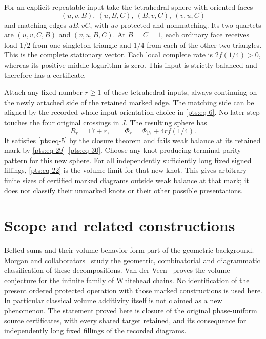 For an explicit repeatable input take the tetrahedral sphere with
oriented faces \begin{equation}\label{pts:eq-31}
(u,v,B),\ (u,B,C),\ (B,v,C),\ (v,u,C)
\end{equation} and matching edges \(uB,vC\), with \(uv\) protected and nonmatching.
Its two quartets are \((u,v,C,B)\) and \((v,u,B,C)\). At \(B=C=1\), each
ordinary face receives load \(1/2\) from one singleton triangle and
\(1/4\) from each of the other two triangles. This is the complete
stationary vector. Each local complete rate is \(2f(1/4)>0\), whereas
its positive middle logarithm is zero. This input is strictly balanced
and therefore has a certificate.

Attach any fixed number \(r\ge1\) of these tetrahedral inputs, always
continuing on the newly attached side of the retained marked edge. The
matching side can be aligned by the recorded whole-input orientation
choice in \eqref{pts:eq-6}. No later step touches the four original crossings in
\(J\). The resulting sphere has \begin{equation}\label{pts:eq-32}
R_r=17+r,\qquad
              \Phi_r=\Phi_{17}+4r f(1/4).
\end{equation} It satisfies \eqref{pts:eq-5} by the closure theorem and fails weak balance at its
retained mark by \eqref{pts:eq-29}--\eqref{pts:eq-30}. Choose any knot-producing terminal parity
pattern for this new sphere. For all independently sufficiently long
fixed signed fillings, \eqref{pts:eq-22} is the volume limit for that new knot. This
gives arbitrary finite sizes of certified marked diagrams outside weak
balance at that mark; it does not classify their unmarked knots or their
other possible presentations.

\section{Scope and related
constructions}\label{pts:sec-8}

Belted sums and their volume behavior form part of the geometric
background. Morgan and collaborators~\cite{MorganEtAlBeltedSums}
study the geometric, combinatorial and diagrammatic classification of
these decompositions. Van der Veen~\cite{VanDerVeenWhiteheadChains}
proves the volume conjecture for the infinite family of Whitehead chains.
No identification of the present ordered
protected operation with those marked constructions is used here. In
particular classical volume additivity itself is not claimed as a new
phenomenon. The statement proved here is closure of the original
phase-uniform source certificates, with every shared target retained,
and its consequence for independently long fixed fillings of the recorded
diagrams.

